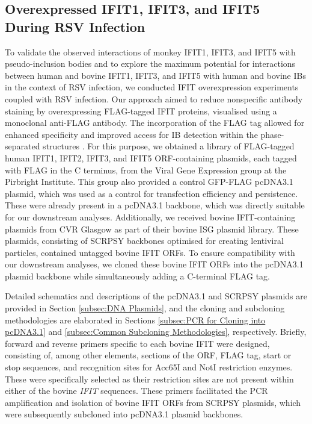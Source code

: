 \subsection{Overexpressed IFIT1, IFIT3, and IFIT5 During RSV Infection} \label{subsec:Overexpressed IFIT1, IFIT3, and IFIT5 During RSV Infection}
To validate the observed interactions of monkey IFIT1, IFIT3, and IFIT5 with pseudo-inclusion bodies and to explore the maximum potential for interactions between human and bovine IFIT1, IFIT3, and IFIT5 with human and bovine IBs in the context of RSV infection, we conducted IFIT overexpression experiments coupled with RSV infection. Our approach aimed to reduce nonspecific antibody staining by overexpressing FLAG-tagged IFIT proteins, visualised using a monoclonal anti-FLAG antibody. The incorporation of the FLAG tag allowed for enhanced specificity and improved access for IB detection within the phase-separated structures \cite{Munro1984Use70.}. For this purpose, we obtained a library of FLAG-tagged human IFIT1, IFIT2, IFIT3, and IFIT5 ORF-containing plasmids, each tagged with FLAG in the C terminus, from the Viral Gene Expression group at the Pirbright Institute. This group also provided a control GFP-FLAG pcDNA3.1 plasmid, which was used as a control for transfection efficiency and persistence. These were already present in a pcDNA3.1 backbone, which was directly suitable for our downstream analyses. Additionally, we received bovine IFIT-containing plasmids from CVR Glasgow as part of their bovine ISG plasmid library. These plasmids, consisting of SCRPSY backbones optimised for creating lentiviral particles, contained untagged bovine IFIT ORFs. To ensure compatibility with our downstream analyses, we cloned these bovine IFIT ORFs into the pcDNA3.1 plasmid backbone while simultaneously adding a C-terminal FLAG tag.

Detailed schematics and descriptions of the pcDNA3.1 and SCRPSY plasmids are provided in Section \ref{subsec:DNA Plasmids}, and the cloning and subcloning methodologies are elaborated in Sections \ref{subsec:PCR for Cloning into pcDNA3.1} and \ref{subsec:Common Subcloning Methodologies}, respectively. Briefly, forward and reverse primers specific to each bovine IFIT were designed, consisting of, among other elements, sections of the ORF, FLAG tag, start or stop sequences, and recognition sites for Acc65I and NotI restriction enzymes. These were specifically selected as their restriction sites are not present within either of the bovine \textit{IFIT} sequences. These primers facilitated the PCR amplification and isolation of bovine IFIT ORFs from SCRPSY plasmids, which were subsequently subcloned into pcDNA3.1 plasmid backbones.

